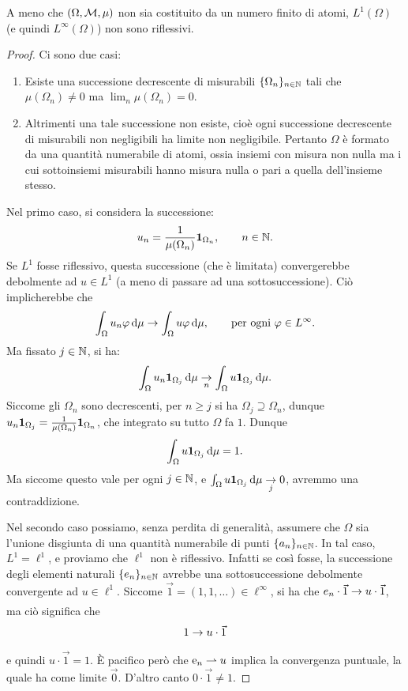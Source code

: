 \begin{theorem}
	A meno che $(\Omega, \M, \mu)$ non sia costituito da un numero finito di atomi, $L^1(\Omega)$ (e quindi $L^\infty(\Omega)$) non sono riflessivi.
\end{theorem}
\begin{proof}
	Ci sono due casi:
	\begin{enumerate}
		\item Esiste una successione decrescente di misurabili $\{\Omega_n\}_{n \in \N}$ tali che $\mu(\Omega_n) \neq 0$ ma $\lim_n \mu(\Omega_n) = 0$.

		\item Altrimenti una tale successione non esiste, cioè ogni successione decrescente di misurabili non negligibili ha limite non negligibile. Pertanto $\Omega$ è formato da una quantità numerabile di atomi, ossia insiemi con misura non nulla ma i cui sottoinsiemi misurabili hanno misura nulla o pari a quella dell'insieme stesso.
	\end{enumerate}

	Nel primo caso, si considera la successione:
	\begin{equation*}
		u_n = \frac1{\mu(\Omega_n)} \ind_{\Omega_n}, \qquad n \in \N.
	\end{equation*}
	Se $L^1$ fosse riflessivo, questa successione (che è limitata) convergerebbe debolmente ad $u \in L^1$ (a meno di passare ad una sottosuccessione). Ciò implicherebbe che
	\begin{equation*}
		\int_\Omega u_n \varphi \,\de\mu \conv \int_\Omega u \varphi\,\de\mu, \qquad \text{per ogni $\varphi \in L^\infty$}.
	\end{equation*}
	Ma fissato $j \in \N$, si ha:
	\begin{equation*}
		\int_\Omega u_n \ind_{\Omega_j} \,\de\mu \conv[n] \int_\Omega u \ind_{\Omega_j}\,\de\mu.
	\end{equation*}
	Siccome gli $\Omega_n$ sono decrescenti, per $n \geq j$ si ha $\Omega_j \supseteq \Omega_n$, dunque $u_n \ind_{\Omega_j} = \frac1{\mu(\Omega_n)} \ind_{\Omega_n}$, che integrato su tutto $\Omega$ fa $1$. Dunque
	\begin{equation*}
		\int_\Omega u \ind_{\Omega_j} \,\de\mu = 1.
	\end{equation*}
	Ma siccome questo vale per ogni $j \in \N$, e $\int_\Omega u \ind_{\Omega_j}\,\de\mu \conv[j] 0$, avremmo una contraddizione.

	Nel secondo caso possiamo, senza perdita di generalità, assumere che $\Omega$ sia l'unione disgiunta di una quantità numerabile di punti $\{a_n\}_{n \in \N}$.
	In tal caso, $L^1 = \ell^1$, e proviamo che $\ell^1$ non è riflessivo.
	Infatti se così fosse, la successione degli elementi naturali $\{e_n\}_{n \in \N}$ avrebbe una sottosuccessione debolmente convergente ad $u \in \ell^1$. Siccome $\vec 1 =(1,1, \ldots) \in \ell^\infty$, si ha che $e_n \cdot \vec 1 \conv u \cdot \vec 1$, ma ciò significa che
	\begin{equation*}
		1 \conv u \cdot \vec 1
	\end{equation*}
	e quindi $u \cdot \vec 1 = 1$.
	È pacifico però che $\e_n \weakconv u$ implica la convergenza puntuale, la quale ha come limite $\vec 0$. D'altro canto $0 \cdot \vec 1 \neq 1$.


\end{proof}
